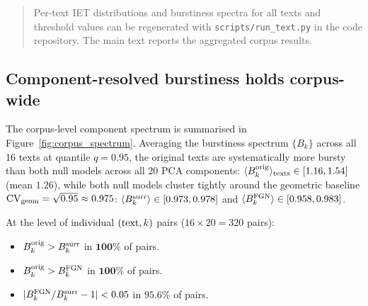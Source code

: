 \documentclass[preprint]{elsarticle}
\newcommand{\bk}{B_k}
\newcommand{\CV}{\mathrm{CV}}
\begin{document}
\begin{quote}
Per-text IET distributions and burstiness spectra for all texts and
threshold values can be regenerated with \texttt{scripts/run\_text.py}
in the code repository. The main text reports the aggregated corpus
results.
\end{quote}



\subsection{Component-resolved burstiness holds corpus-wide}
\label{sec:corpus_ordering}

The corpus-level component spectrum is summarised in
Figure~\ref{fig:corpus_spectrum}.
Averaging the burstiness spectrum $\{\bk\}$ across all 16 texts
at quantile $q = 0.95$, the original texts are systematically more
bursty than both null models across all 20 PCA components:
$\langle B_k^{\rm orig}\rangle_{\rm texts} \in [1.16, 1.54]$
(mean $1.26$), while both null models cluster tightly around
the geometric baseline $\CV_{\rm geom} = \sqrt{0.95} \approx 0.975$:
$\langle B_k^{\rm surr}\rangle \in [0.973, 0.978]$ and
$\langle B_k^{\rm FGN}\rangle \in [0.958, 0.983]$.

At the level of individual $({\rm text}, k)$ pairs
($16 \times 20 = 320$ pairs):
\begin{itemize}
  \item $B_k^{\rm orig} > B_k^{\rm surr}$ in $\mathbf{100\%}$ of pairs.
  \item $B_k^{\rm orig} > B_k^{\rm FGN}$ in $\mathbf{100\%}$ of pairs.
  \item $|B_k^{\rm FGN}/B_k^{\rm surr} - 1| < 0.05$ in
        $\mathbf{95.6\%}$ of pairs.
\end{itemize}
\end{document}
